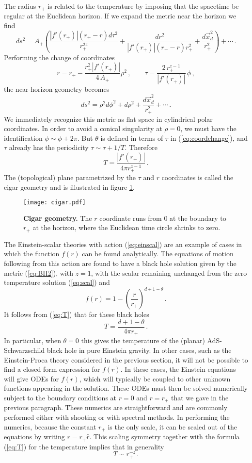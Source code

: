 \documentclass[10pt, oneside]{book}
\def\be{\begin{equation}}
\def\ee{\end{equation}}
\begin{document}
\begin{doublespace}
The radius $r_+$ is related to the temperature by imposing that the spacetime be regular at the Euclidean horizon. If we expand the metric near the horizon we find
\be\label{eq:BHnearh}
ds^2 =  A_+ \left( \frac{|f'(r_+)| (r_+ - r) d\tau^2}{r_+^{2z}} + \frac{dr^2}{|f'(r_+)| (r_+ - r) r_+^2} + \frac{d\vec x^2_{d} }{r_+^2} \right) + \cdots \,.
\ee
Performing the change of coordinates
\be\label{eq:coordchange}
r  = r_+ - \frac{r_+^2 |f'(r_+)|}{4 \, A_+} \rho^2 \,, \qquad \tau = \frac{2 \, r_+^{z-1}}{|f'(r_+)|} \, \phi \,,
\ee
the near-horizon geometry becomes
\be
ds^2 = \rho^2 d\phi^2 + d\rho^2 + \frac{d\vec x^2_{d} }{r_+^2} + \cdots \,.
\ee
We immediately recognize this metric as flat space in cylindrical polar coordinates. In order to avoid a conical singularity at $\rho = 0$, we must have the identification $\phi \sim \phi + 2 \pi$. But $\theta$ is defined in terms of $\tau$ in (\ref{eq:coordchange}), and $\tau$ already has the periodicity $\tau \sim \tau + 1/T$. Therefore
\be\label{eq:T}
T = \frac{|f'(r_+)|}{4 \pi r_+^{z-1}} \,.
\ee
The (topological) plane parametrized by the $\tau$ and $r$ coordinates is called the cigar geometry and is illustrated in figure \ref{fig:cigar}.
\begin{figure}[h]
\centering
\texttt{[image: cigar.pdf]}
\caption{\label{fig:cigar} {\bf Cigar geometry.} The $r$ coordinate runs from $0$ at the boundary to $r_+$ at the horizon, where the Euclidean time circle shrinks to zero.}
\end{figure}

The Einstein-scalar theories with action (\ref{eq:einscal}) are an example of cases in which the function $f(r)$ can be found analytically. The equations of motion following from this action are found to have a black hole solution given by the metric (\ref{eq:BH2}), with $z=1$, with the scalar remaining unchanged from the zero temperature solution (\ref{eq:scal}) and
\be
f(r) = 1 - \left( \frac{r}{r_+}\right)^{d+1-\theta} \,.   \label{eq:emblackfactor}
\ee
It follows from (\ref{eq:T}) that for these black holes
\be\label{eq:Tgo}
T = \frac{d+1-\theta}{4 \pi r_+} \,.
\ee
In particular, when $\theta = 0$ this gives the temperature of the (planar) AdS-Schwarzschild black hole in pure Einstein gravity. In other cases, such as the Einstein-Proca theory considered in the previous section, it will not be possible to find a closed form expression for $f(r)$. In these cases, the Einstein equations will give ODEs for $f(r)$, which will typically be coupled to other unknown functions appearing in the solution. These ODEs must then be solved numerically subject to the boundary conditions at $r=0$ and $r=r_+$ that we gave in the previous paragraph. These numerics are straightforward and are commonly performed either with shooting or with spectral methods. In performing the numerics, because the constant $r_+$ is the only scale, it can be scaled out of the equations by writing $r = r_+ \hat r$. This scaling symmetry together with the formula (\ref{eq:T}) for the temperature implies that in generality
\be\label{eq:Trp}
T \sim r_+^{-z} \,.
\ee


\end{doublespace}
\end{document}
